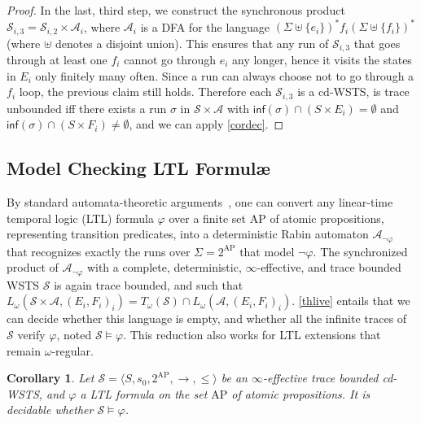 \documentclass[11pt,reqno,a4paper]{amsart}
\newcommand{\tup}[1]{\langle #1\rangle}
\renewcommand{\cite}{\citep}
\theoremstyle{plain}
\newtheorem{corollary}[theorem]{Corollary}
\theoremstyle{definition}
\theoremstyle{remark}
\begin{document}
\begin{proof}
  In the last, third step, we construct the synchronous product
  $\mathcal{S}_{i,3}=\mathcal{S}_{i,2}\times\mathcal{A}_i$, where
  $\mathcal{A}_i$ is a DFA for the language $(\Sigma\uplus\{e_i\})^\ast
  f_i(\Sigma\uplus \{f_i\})^\ast$ (where $\uplus$ denotes a disjoint
  union).  This ensures that any run of $\mathcal{S}_{i,3}$ that goes
  through at least one $f_i$ cannot go through $e_i$ any longer, hence
  it visits the states in $E_i$ only finitely many often.  Since a run
  can always choose not to go through a $f_i$ loop, the previous claim
still holds.  Therefore each $\mathcal{S}_{i,3}$ is a cd-WSTS, is
  trace unbounded iff there exists a run $\sigma$ in
  $\mathcal{S}\times\mathcal{A}$ with $\mathsf{inf}(\sigma)\cap(S\times
  E_i)=\emptyset$ and $\mathsf{inf}(\sigma)\cap(S\times
  F_i)\neq\emptyset$, and we can apply \autoref{cordec}.\end{proof}

\subsection{Model Checking LTL Formul\ae}\label{sub:decltl}
By standard automata-theoretic arguments~\cite{vw,safra}, one can
convert any linear-time temporal logic (LTL) formula $\varphi$ over a
finite set $\mathrm{AP}$ of atomic propositions, representing
transition predicates, into a deterministic Rabin
automaton $\mathcal{A}_{\neg\varphi}$ that recognizes exactly the runs over
$\Sigma=2^{\mathrm{AP}}$ that model $\neg\varphi$.  The synchronized product of
$\mathcal{A}_{\neg\varphi}$ with a complete, deterministic,
$\infty$-effective, and trace bounded WSTS $\mathcal{S}$ is again
trace bounded, and such that
$L_\omega(\mathcal{S}\times\mathcal{A},(E_i,F_i)_i)=T_\omega(\mathcal{S})\cap
L_\omega(\mathcal{A},(E_i,F_i)_i)$.
\autoref{thlive} entails that we can decide whether this language is empty,
and whether all the infinite traces of $\mathcal{S}$ verify
$\varphi$, noted $\mathcal{S}\models\varphi$.  This reduction also works
for LTL extensions that remain $\omega$-regular.
\begin{corollary}\label{corltl}
  Let $\mathcal{S}=\tup{S,s_0,2^{\mathrm{AP}},\rightarrow,\leq}$ be an
  $\infty$-effective trace bounded cd-WSTS, and $\varphi$ a LTL
  formula on the set $\mathrm{AP}$ of atomic propositions.  It is
  decidable whether $\mathcal{S}\models\varphi$. 
\end{corollary}
\end{document}

